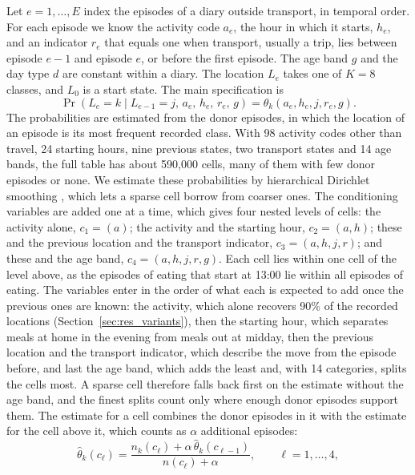 \documentclass[a4paper]{article}
\begin{document}
Let $e = 1, \dots, E$ index the episodes of a diary outside transport, in temporal order. For each episode we know the activity code $a_e$, the hour in which it starts, $h_e$, and an indicator $r_e$ that equals one when transport, usually a trip, lies between episode $e-1$ and episode $e$, or before the first episode. The age band $g$ and the day type $d$ are constant within a diary. The location $L_e$ takes one of $K = 8$ classes, and $L_0$ is a start state. The main specification is
\begin{equation}
  \Pr(L_e = k \mid L_{e-1} = j,\, a_e,\, h_e,\, r_e,\, g) = \theta_k(a_e, h_e, j, r_e, g).
  \label{eq:markov}
\end{equation}
The probabilities are estimated from the donor episodes, in which the location of an episode is its most frequent recorded class. With 98 activity codes other than travel, 24 starting hours, nine previous states, two transport states and 14 age bands, the full table has about 590,000 cells, many of them with few donor episodes or none. We estimate these probabilities by hierarchical Dirichlet smoothing \parencite{mackayHierarchicalDirichletLanguage1995}, which lets a sparse cell borrow from coarser ones. The conditioning variables are added one at a time, which gives four nested levels of cells: the activity alone, $c_1 = (a)$; the activity and the starting hour, $c_2 = (a, h)$; these and the previous location and the transport indicator, $c_3 = (a, h, j, r)$; and these and the age band, $c_4 = (a, h, j, r, g)$. Each cell lies within one cell of the level above, as the episodes of eating that start at 13:00 lie within all episodes of eating. The variables enter in the order of what each is expected to add once the previous ones are known: the activity, which alone recovers 90\% of the recorded locations (Section~\ref{sec:res_variants}), then the starting hour, which separates meals at home in the evening from meals out at midday, then the previous location and the transport indicator, which describe the move from the episode before, and last the age band, which adds the least and, with 14 categories, splits the cells most. A sparse cell therefore falls back first on the estimate without the age band, and the finest splits count only where enough donor episodes support them. The estimate for a cell combines the donor episodes in it with the estimate for the cell above it, which counts as $\alpha$ additional episodes:
\begin{equation}
  \hat\theta_k(c_\ell) = \frac{n_k(c_\ell) + \alpha\, \hat\theta_k(c_{\ell-1})}{n(c_\ell) + \alpha}, \qquad \ell = 1, \dots, 4,
  \label{eq:smoothing}
\end{equation}
\end{document}
